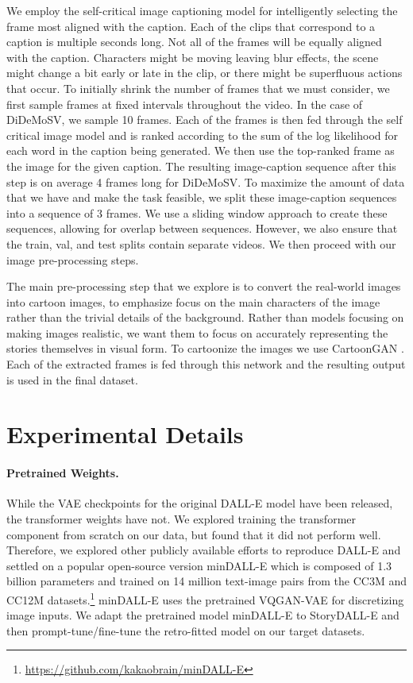 \documentclass[runningheads]{llncs}
\begin{document}
We employ the self-critical image captioning model \cite{rennie2017self} for intelligently selecting the frame most aligned with the caption. Each of the clips that correspond to a caption is multiple seconds long. Not all of the frames will be equally aligned with the caption. Characters might be moving leaving blur effects, the scene might change a bit early or late in the clip, or there might be superfluous actions that occur. To initially shrink the number of frames that we must consider, we first sample frames at fixed intervals throughout the video. In the case of DiDeMoSV, we sample 10 frames. Each of the frames is then fed through the self critical image model and is ranked according to the sum of the log likelihood for each word in the caption being generated. We then use the top-ranked frame as the image for the given caption. The resulting image-caption sequence after this step is on average 4 frames long for DiDeMoSV. To maximize the amount of data that we have and make the task feasible, we split these image-caption sequences into a sequence of 3 frames. We use a sliding window approach to create these sequences, allowing for overlap between sequences. However, we also ensure that the train, val, and test splits contain separate videos. We then proceed with our image pre-processing steps.

The main pre-processing step that we explore is to convert the real-world images into cartoon images, to emphasize focus on the main characters of the image rather than the trivial details of the background. Rather than models focusing on making images realistic, we want them to focus on accurately representing the stories themselves in visual form. To cartoonize the images we use CartoonGAN \cite{chen2018cartoongan}. Each of the extracted frames is fed through this network and the resulting output is used in the final dataset.


\section{Experimental Details}
\paragraph{Pretrained Weights.}
While the VAE checkpoints for the original DALL-E model have been released, the transformer weights have not. We explored training the transformer component from scratch on our data, but found that it did not perform well. Therefore, we explored other publicly available efforts to reproduce DALL-E and settled on a popular open-source version minDALL-E which is composed of 1.3 billion parameters and trained on 14 million text-image pairs from the CC3M \cite{sharma2018conceptual} and CC12M \cite{changpinyo2021conceptual} datasets.\footnote{\url{https://github.com/kakaobrain/minDALL-E}}
minDALL-E uses the pretrained VQGAN-VAE \cite{esser2021taming} for discretizing image inputs. We adapt the pretrained model minDALL-E to StoryDALL-E and then prompt-tune/fine-tune the retro-fitted model on our target datasets.
\end{document}
